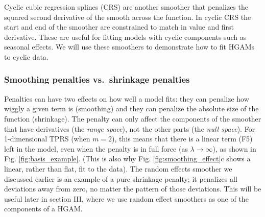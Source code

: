 \documentclass[12pt]{article}
\begin{document}
Cyclic cubic regression splines (CRS) are another smoother that
penalizes the squared second derivative of the smooth across the
function. In cyclic CRS the start and end of the smoother are
constrained to match in value and first derivative. These are useful for
fitting models with cyclic components such as seasonal effects. We will
use these smoothers to demonstrate how to fit HGAMs to cyclic data.

\subsubsection{Smoothing penalties vs.~shrinkage
penalties}\label{smoothing-penalties-vs.shrinkage-penalties}

Penalties can have two effects on how well a model fits: they can
penalize how wiggly a given term is (smoothing) and they can penalize
the absolute size of the function (shrinkage). The penalty can only
affect the components of the smoother that have derivatives (the
\emph{range space}), not the other parts (the \emph{null space}). For
1-dimensional TPRS (when \(m=2\)), this means that there is a linear
term (F5) left in the model, even when the penalty is in full force (as
\(\lambda \rightarrow \infty\)), as shown in Fig.
\ref{fig:basis_example}. (This is also why Fig.
\ref{fig:smoothing_effect}c shows a linear, rather than flat, fit to the
data). The random effects smoother we discussed earlier is an example of
a pure shrinkage penalty; it penalizes all deviations away from zero, no
matter the pattern of those deviations. This will be useful later in
section III, where we use random effect smoothers as one of the
components of a HGAM.
\end{document}
